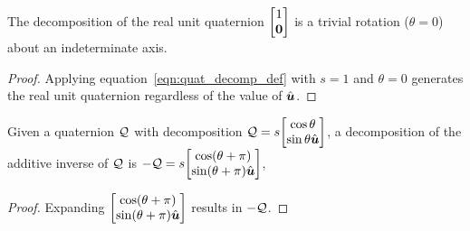 \begin{corollary}\label{thm:quat_real_unit_decomp_indeterminate}
The decomposition of the real unit quaternion $\quatsv 1{\vect 0}$ is
a trivial rotation ($\theta=0$) about an indeterminate axis.
\end{corollary}
\begin{proof}
Applying equation~\eqref{eqn:quat_decomp_def} with $s=1$ and $\theta=0$
generates the real unit quaternion regardless of the value of $\hat{\boldsymbol{u}}$.
\end{proof}

\begin{corollary}\label{thm:quat_negation_rotates_by_pi}
Given a quaternion $\mathcal{Q}$ with decomposition
$\quat Q = s\quatsv{\cos\theta}{\sin\theta \vhat u}$,
a decomposition of the additive inverse of $\mathcal{Q}$ is
$-\quat Q = s\quatsv{\cos(\theta+\pi)}{\sin(\theta+\pi) \vhat u}$,
\end{corollary}
\begin{proof}
Expanding $\quatsv{\cos(\theta+\pi)}{\sin(\theta+\pi) \vhat u}$
results in $-\mathcal{Q}$.
\end{proof}

